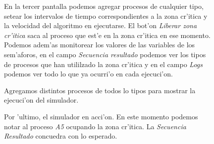 \begin{figure}[h!]
\centering
 \caption{En la tercer pantalla podemos agregar procesos de cualquier tipo,
setear los intervalos de tiempo correspondientes a la zona cr'itica y la
velocidad del algoritmo en ejecutarse. El bot'on \emph{Liberar zona cr'itica}
saca al proceso que est'e en la zona cr'itica en ese momento. Podemos adem'as
monitorear los valores de las variables de
los sem'aforos, en el campo \emph{Secuencia resultado} podemos ver los tipos de
procesos que han utililzado la zona cr'itica y en el campo \emph{Logs} podemos
ver todo lo que ya ocurri'o en cada ejecuci'on.}
\end{figure}
\newpage

\begin{figure}[h!]
\centering
 \caption{Agregamos distintos procesos de todos lo tipos para mostrar la ejecuci'on del simulador.}
\end{figure}

\begin{figure}[h!]
\centering
 \caption{Por 'ultimo, el simulador en acci'on. En este momento podemos notar al proceso \emph{A5} ocupando la zona cr'itica. La \emph{Secuencia Resultado} concuedra con lo esperado.}
\end{figure}
